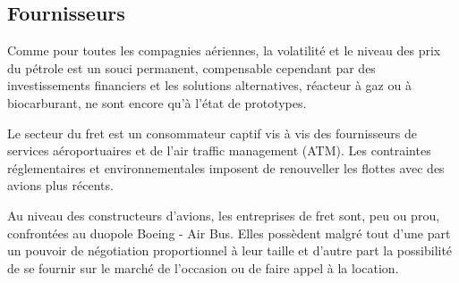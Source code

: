 \subsection{Fournisseurs}

Comme pour toutes les compagnies aériennes, la volatilité et le niveau des prix du pétrole est un souci permanent, compensable cependant par des investissements financiers et les solutions alternatives, réacteur à gaz ou à biocarburant, ne sont encore qu'à l'état de prototypes. 

Le secteur du fret est un consommateur captif vis à vis des fournisseurs de services aéroportuaires et de l'air traffic management (ATM). Les contraintes réglementaires et environnementales imposent de renouveller les flottes avec des avions plus récents.

Au niveau des constructeurs d'avions, les entreprises de fret sont, peu ou prou, confrontées au duopole Boeing - Air Bus. Elles possèdent malgré tout d'une part un pouvoir de négotiation proportionnel à leur taille et d'autre part la possibilité de se fournir sur le marché de l'occasion ou de faire appel à la location.

 
